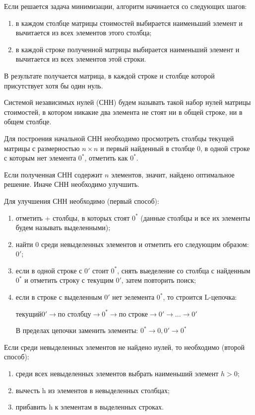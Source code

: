 \documentclass[a4paper,14pt]{article}
\begin{document}
Если решается задача минимизации, алгоритм начинается со следующих шагов:
\begin{enumerate}
\item в каждом столбце матрицы стоимостей выбирается наименьший элемент и вычитается из всех элементов этого столбца;
\item в каждой строке полученной матрицы выбирается наименьший элемент и вычитается из всех элементов этой строки.
\end{enumerate}

В результате получается матрица, в каждой строке и столбце которой присутствует хотя бы один нуль.

Системой независимых нулей (СНН) будем называть такой набор нулей матрицы стоимостей, в котором никакие два элемента не стоят ни в общей строке, ни в общем столбце.

Для построения начальной СНН необходимо просмотреть столбцы текущей матрицы с размерностью $n \times n$ и первый найденный в столбце 0, в одной строке с которым нет элемента $0^*$, отметить как $0^*$. 

Если полученная СНН содержит $n$ элементов, значит, найдено оптимальное решение. Иначе СНН необходимо улучшить.

Для улучшения СНН необходимо (первый способ):
\begin{enumerate}
\item отметить + столбцы, в которых стоят $0^*$ (данные столбцы и все их элементы будем называть выделенными);
\item найти 0 среди невыделенных элементов и отметить его следующим образом: $0'$;
\item если в одной строке с $0'$ стоит $0^*$, снять выеделение со столбца с найденным $0^*$ и отметить строку с текущим $0'$, затем повторить поиск;

\item если в строке с выделенным $0'$ нет эелемента $0^*$, то строится L-цепочка:

$текущий 0' \rightarrow \text{по столбцу} \rightarrow 0^* \rightarrow \text{по строке} \rightarrow 0' \rightarrow ... \rightarrow 0'$

В пределах цепочки заменить элементы: $0^* \rightarrow 0, 0' \rightarrow 0^*$
\end{enumerate}

Если среди невыделенных элементов не найдено нулей, то необходимо (второй способ):
\begin{enumerate}
\item среди всех невыделенных элементов выбрать наименьший элемент $h>0$;
\item вычесть h из элементов в невыделенных столбцах;
\item прибавить h к элементам в выделенных строках.
\end{enumerate}
\end{document}

